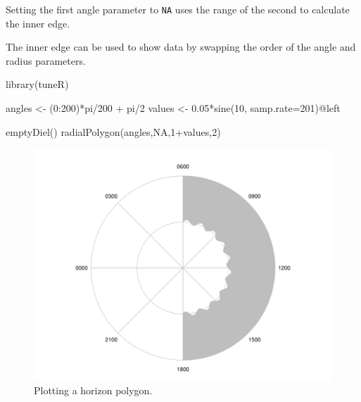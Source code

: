 \documentclass[
]{book}
\newenvironment{Shaded}{\begin{snugshade}}{\end{snugshade}}
\newcommand{\AttributeTok}[1]{\textcolor[rgb]{0.77,0.63,0.00}{#1}}
\newcommand{\ConstantTok}[1]{\textcolor[rgb]{0.00,0.00,0.00}{#1}}
\newcommand{\DecValTok}[1]{\textcolor[rgb]{0.00,0.00,0.81}{#1}}
\newcommand{\FloatTok}[1]{\textcolor[rgb]{0.00,0.00,0.81}{#1}}
\newcommand{\FunctionTok}[1]{\textcolor[rgb]{0.00,0.00,0.00}{#1}}
\newcommand{\NormalTok}[1]{#1}
\newcommand{\OtherTok}[1]{\textcolor[rgb]{0.56,0.35,0.01}{#1}}
\newcommand{\SpecialCharTok}[1]{\textcolor[rgb]{0.00,0.00,0.00}{#1}}
\begin{document}
Setting the first angle parameter to \texttt{NA} uses the range of the second to calculate the inner edge.

The inner edge can be used to show data by swapping the order of the angle and radius parameters.

\begin{Shaded}
\begin{Highlighting}[]
\FunctionTok{library}\NormalTok{(tuneR)}

\NormalTok{angles }\OtherTok{\textless{}{-}}\NormalTok{ (}\DecValTok{0}\SpecialCharTok{:}\DecValTok{200}\NormalTok{)}\SpecialCharTok{*}\NormalTok{pi}\SpecialCharTok{/}\DecValTok{200} \SpecialCharTok{+}\NormalTok{ pi}\SpecialCharTok{/}\DecValTok{2}
\NormalTok{values }\OtherTok{\textless{}{-}} \FloatTok{0.05}\SpecialCharTok{*}\FunctionTok{sine}\NormalTok{(}\DecValTok{10}\NormalTok{, }\AttributeTok{samp.rate=}\DecValTok{201}\NormalTok{)}\SpecialCharTok{@}\NormalTok{left}

\FunctionTok{emptyDiel}\NormalTok{()}
\FunctionTok{radialPolygon}\NormalTok{(angles,}\ConstantTok{NA}\NormalTok{,}\DecValTok{1}\SpecialCharTok{+}\NormalTok{values,}\DecValTok{2}\NormalTok{)}
\end{Highlighting}
\end{Shaded}

\begin{figure}

{\centering \includegraphics[width=0.9\linewidth]{_main_files/figure-latex/radialPolygon-horizon2-1} 

}

\caption{Plotting a horizon polygon.}\label{fig:radialPolygon-horizon2}
\end{figure}
\end{document}
